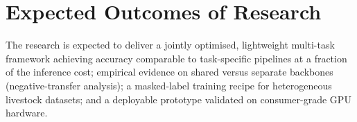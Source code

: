\section{Expected Outcomes of Research}
The research is expected to deliver a jointly optimised, lightweight multi-task framework achieving accuracy comparable to task-specific pipelines at a fraction of the inference cost; empirical evidence on shared versus separate backbones (negative-transfer analysis); a masked-label training recipe for heterogeneous livestock datasets; and a deployable prototype validated on consumer-grade GPU hardware.
